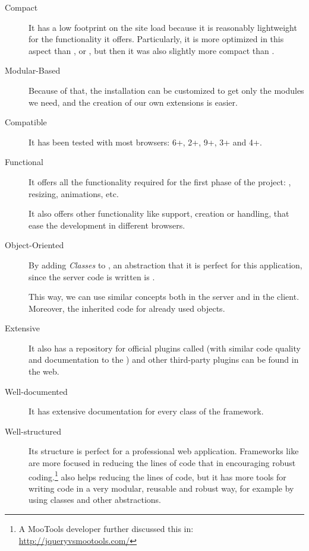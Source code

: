 \begin{description}

  \item[Compact] It has a low footprint on the site load because it is reasonably lightweight for the functionality it offers.
  Particularly, it is more optimized in this aspect than ,  or , but then it was also slightly more compact than .

  \item[Modular-Based] Because of that, the installation can be customized to get only the modules we need, and the creation of our own extensions is easier.

  \item[Compatible] It has been tested with most browsers:  6+,  2+,  9+,  3+ and  4+.

  \item[Functional] It offers all the functionality required for the first phase of the project: , resizing, animations, etc.

  It also offers other functionality like  support,  creation or  handling, that ease the development in different browsers.

  \item[Object-Oriented] By adding \emph{Classes} to , an abstraction that it is perfect for this application, since the server code is written is .

  This way, we can use similar concepts both in the server and in the client.
  Moreover, the inherited code for  already used  objects.

  \item[Extensive] It also has a repository for official plugins called   (with similar code quality and documentation to the ) and other third-party plugins can be found in the web.

  \item[Well-documented] It has extensive documentation for every class of the  framework.

  \item[Well-structured] Its structure is perfect for a professional web application.
  Frameworks like  are more focused in reducing the lines of code that in encouraging robust coding.\footnote{A MooTools developer further discussed this in: \url{http://jqueryvsmootools.com/}}
   also helps reducing the lines of code, but it has more tools for writing code in a very modular, reusable and robust way, for example by using classes and other abstractions.


\end{description}
